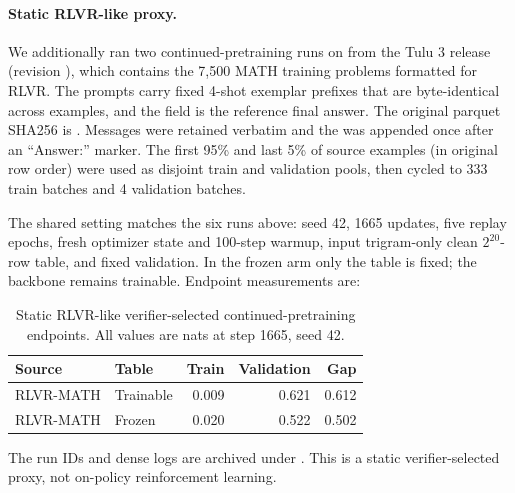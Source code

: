\paragraph{Static RLVR-like proxy.}
We additionally ran two continued-pretraining runs on  from the Tulu 3 release~\citep{lambert2024tulu3} (revision ), which contains the 7,500 MATH training problems formatted for RLVR. The prompts carry fixed 4-shot exemplar prefixes that are byte-identical across examples, and the  field is the reference final answer. The original parquet SHA256 is . Messages were retained verbatim and the  was appended once after an ``Answer:'' marker. The first 95\% and last 5\% of source examples (in original row order) were used as disjoint train and validation pools, then cycled to 333 train batches and 4 validation batches.

The shared setting matches the six runs above: seed 42, 1665 updates, five replay epochs, fresh optimizer state and 100-step warmup, input trigram-only clean $2^{20}$-row table, and fixed validation. In the frozen arm only the table is fixed; the backbone remains trainable. Endpoint measurements are:
\begin{table}[!htbp]
\centering\small
\caption{Static RLVR-like verifier-selected continued-pretraining endpoints. All values are nats at step 1665, seed 42.}
\label{tab:rlvr-results}
\begin{tabular}{llrrr}
\toprule
Source & Table & Train & Validation & Gap\\
\midrule
RLVR-MATH & Trainable & 0.009 & 0.621 & 0.612\\
RLVR-MATH & Frozen & 0.020 & 0.522 & 0.502\\
\bottomrule
\end{tabular}
\end{table}

The run IDs and dense logs are archived under . This is a static verifier-selected proxy, not on-policy reinforcement learning.
